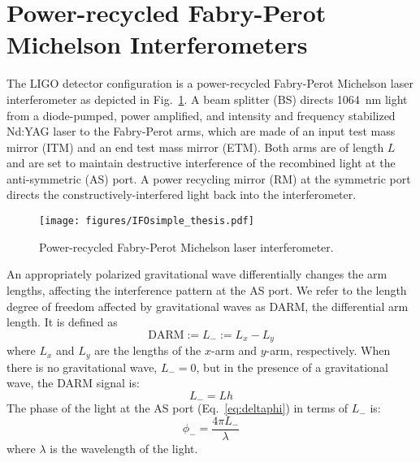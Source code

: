 


\section{Power-recycled Fabry-Perot Michelson Interferometers}
The LIGO detector configuration is a power-recycled Fabry-Perot
Michelson laser interferometer as depicted in
Fig.~\ref{fig:IFOschematic}. A beam splitter (BS) directs 1064~nm
light from a diode-pumped, power amplified, and intensity and
frequency stabilized Nd:YAG laser to the Fabry-Perot arms, which are
made of an input test mass mirror (ITM) and an end test mass mirror
(ETM). Both arms are of length $L$ and are set to maintain destructive
interference of the recombined light at the anti-symmetric (AS)
port. A power recycling mirror (RM) at the symmetric port directs the
constructively-interfered light back into the interferometer. 

\begin{figure}
\begin{centering}
\texttt{[image: figures/IFOsimple\_thesis.pdf]}
\caption[Power-recycled Fabry-Perot Michelson laser
interferometer]{Power-recycled Fabry-Perot Michelson laser
  interferometer.}
\label{fig:IFOschematic}
\end{centering}
\end{figure}

An appropriately polarized gravitational wave differentially changes
the arm lengths, affecting the interference pattern at the AS port. We
refer to the length degree of freedom affected by gravitational waves
as DARM, the differential arm length. It is defined as
\begin{equation}
\mathrm{DARM} := L_- := L_x - L_y
\end{equation}
where $L_x$ and $L_y$ are the lengths of the $x$-arm and $y$-arm,
respectively. When there is no gravitational wave, $L_-=0$, but in the
presence of a gravitational wave, the DARM signal is:
\begin{equation}
L_- = Lh
\end{equation}
The phase of the light at the AS port (Eq.~\ref{eq:deltaphi}) in terms
of $L_-$ is:
\begin{equation}
\phi_- = \frac{4 \pi L_-}{\lambda}
\end{equation}
where $\lambda$ is the wavelength of the light.


